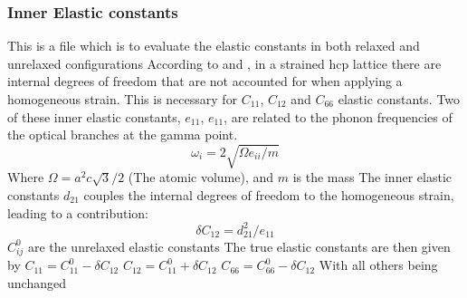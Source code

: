 \documentclass[11pt]{article}
\begin{document}
\subsubsection{Inner Elastic constants}
\label{sec:org39c42e8}
This is a file which is to evaluate the elastic constants in both relaxed and unrelaxed configurations
According to \cite{Clouet2012} and \cite{Cousins1979}, in a strained hcp lattice there are internal degrees of freedom
that are not accounted for when applying a homogeneous strain.
This is necessary for \(C_{11}\), \(C_{12}\) and \(C_{66}\) elastic constants.
Two of these inner elastic constants, \(e_{11}\), \(e_{11}\), are related to the phonon frequencies of the optical branches at the gamma point.
\[\omega_i = 2  \sqrt{ \Omega  e_{ii} / m }\]
Where \(\Omega = a^2  c  \sqrt{3} / 2\) (The atomic volume), and \(m\) is the mass
The inner elastic constants \(d_{21}\) couples the internal degrees of freedom to the homogeneous strain, leading to a contribution:
\[\delta C_{12} = d_{21}^2 / e_{11}\]
\(C^0_{ij}\) are the unrelaxed elastic constants
The true elastic constants are then given by 
\(C_{11} = C^0_{11} - \delta C_{12}\) 
\(C_{12} = C^0_{11} + \delta C_{12}\) 
\(C_{66} = C^0_{66} - \delta C_{12}\) 
With all others being unchanged 
\end{document}

